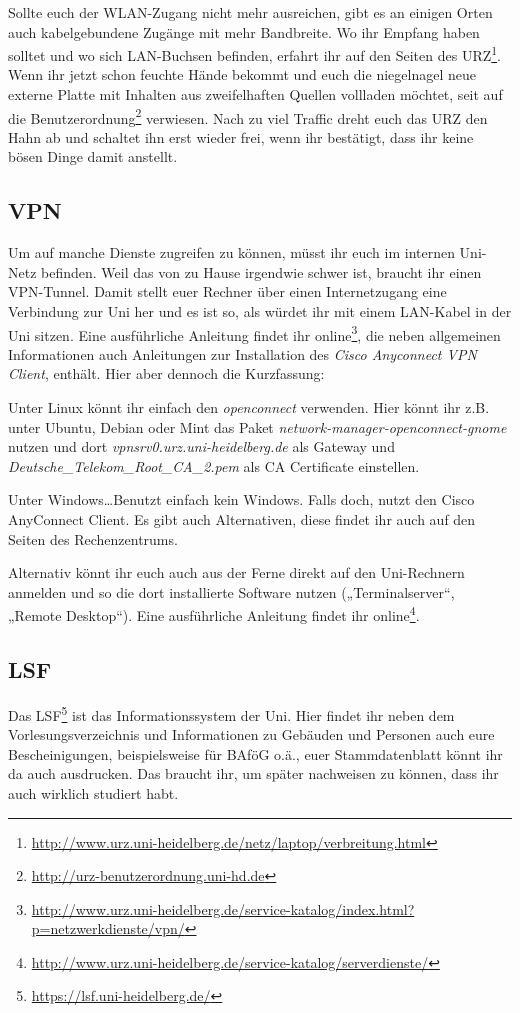 Sollte euch der WLAN-Zugang nicht mehr ausreichen, gibt es an einigen Orten auch kabelgebundene Zugänge mit mehr Bandbreite. Wo ihr Empfang haben solltet und wo sich LAN-Buchsen befinden, erfahrt ihr auf den Seiten des \gls{URZ}\footnote{\url{http://www.urz.uni-heidelberg.de/netz/laptop/verbreitung.html}}. Wenn ihr jetzt schon feuchte Hände bekommt und euch die niegelnagel neue externe Platte mit Inhalten aus zweifelhaften Quellen vollladen möchtet, seit auf die Benutzerordnung\footnote{\url{http://urz-benutzerordnung.uni-hd.de}} verwiesen. Nach zu viel Traffic dreht euch das \gls{URZ} den Hahn ab und schaltet ihn erst wieder frei, wenn ihr bestätigt, dass ihr keine bösen Dinge damit anstellt.

\subsection{VPN}
Um auf manche Dienste zugreifen zu können, müsst ihr euch im internen Uni-Netz befinden. Weil das von zu Hause irgendwie schwer ist, braucht ihr einen VPN-Tunnel. Damit stellt euer Rechner über einen Internetzugang eine Verbindung zur Uni her und es ist so, als würdet ihr mit einem LAN-Kabel in der Uni sitzen. Eine ausführliche Anleitung findet ihr online\footnote{\url{http://www.urz.uni-heidelberg.de/service-katalog/index.html?p=netzwerkdienste/vpn/}}, die neben allgemeinen Informationen auch Anleitungen zur Installation des \emph{Cisco Anyconnect VPN Client}, enthält. Hier aber dennoch die Kurzfassung:

Unter Linux könnt ihr einfach den \emph{openconnect} verwenden. Hier könnt ihr z.B. unter Ubuntu, Debian oder Mint das Paket \emph{network-manager-openconnect-gnome} nutzen und dort \emph{vpnsrv0.urz.uni-heidelberg.de} als Gateway und \emph{Deutsche\_Telekom\_Root\_CA\_2.pem} als CA Certificate einstellen.

Unter Windows\ldots Benutzt einfach kein Windows. Falls doch, nutzt den Cisco AnyConnect Client. Es gibt auch Alternativen, diese findet ihr auch auf den Seiten des Rechenzentrums.

Alternativ könnt ihr euch auch aus der Ferne direkt auf den Uni-Rechnern anmelden und so die dort installierte Software nutzen („Terminalserver“, „Remote Desktop“). Eine ausführliche Anleitung findet ihr online\footnote{\url{http://www.urz.uni-heidelberg.de/service-katalog/serverdienste/}}.

\subsection{LSF}
Das LSF\footnote{\url{https://lsf.uni-heidelberg.de/}} ist das Informationssystem der Uni. Hier findet ihr neben dem Vorlesungsverzeichnis und Informationen zu Gebäuden und Personen auch eure Bescheinigungen, beispielsweise für BAföG o.ä., euer Stammdatenblatt könnt ihr da auch ausdrucken. Das braucht ihr, um später nachweisen zu können, dass ihr auch wirklich studiert habt.

